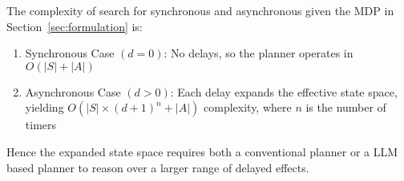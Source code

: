 The complexity of search for synchronous and asynchronous given the MDP in Section~\ref{sec:formulation} is:
\begin{enumerate}
    \item Synchronous Case $(d = 0)$: No delays, so the planner operates in $O(|S| + |A|)$
    \item Asynchronous Case $( d > 0 )$: Each delay expands the effective state space, yielding $O(|S| \times (d+1)^n + |A|)$ complexity, where $n$ is the number of timers
\end{enumerate}

Hence the expanded state space requires both a conventional planner or a LLM based planner to reason over a larger range of delayed effects.

